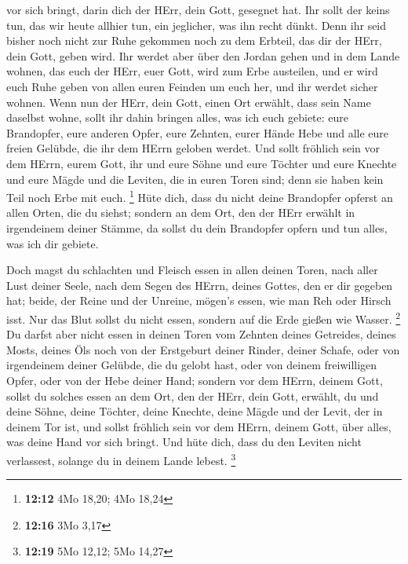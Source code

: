 vor sich bringt, darin dich der HErr, dein Gott, gesegnet hat.
 Ihr sollt der keins tun, das wir heute allhier tun, ein
jeglicher, was ihn recht dünkt.  Denn ihr seid bisher noch
nicht zur Ruhe gekommen noch zu dem Erbteil, das dir der HErr, dein
Gott, geben wird.  Ihr werdet aber über den Jordan gehen
und in dem Lande wohnen, das euch der HErr, euer Gott, wird zum Erbe
austeilen, und er wird euch Ruhe geben von allen euren Feinden um euch
her, und ihr werdet sicher wohnen.  Wenn nun der HErr, dein
Gott, einen Ort erwählt, dass sein Name daselbst wohne, sollt ihr dahin
bringen alles, was ich euch gebiete: eure Brandopfer, eure anderen
Opfer, eure Zehnten, eurer Hände Hebe und alle eure freien Gelübde, die
ihr dem HErrn geloben werdet.  Und sollt fröhlich sein vor
dem HErrn, eurem Gott, ihr und eure Söhne und eure Töchter und eure
Knechte und eure Mägde und die Leviten, die in euren Toren sind; denn
sie haben kein Teil noch Erbe mit euch. \footnote{\textbf{12:12} 4Mo
  18,20; 4Mo 18,24}  Hüte dich, dass du nicht deine
Brandopfer opferst an allen Orten, die du siehst;  sondern
an dem Ort, den der HErr erwählt in irgendeinem deiner Stämme, da sollst
du dein Brandopfer opfern und tun alles, was ich dir gebiete.

 Doch magst du schlachten und Fleisch essen in allen deinen
Toren, nach aller Lust deiner Seele, nach dem Segen des HErrn, deines
Gottes, den er dir gegeben hat; beide, der Reine und der Unreine,
mögen's essen, wie man Reh oder Hirsch isst.  Nur das Blut
sollst du nicht essen, sondern auf die Erde gießen wie Wasser.
\footnote{\textbf{12:16} 3Mo 3,17}  Du darfst aber nicht
essen in deinen Toren vom Zehnten deines Getreides, deines Mosts, deines
Öls noch von der Erstgeburt deiner Rinder, deiner Schafe, oder von
irgendeinem deiner Gelübde, die du gelobt hast, oder von deinem
freiwilligen Opfer, oder von der Hebe deiner Hand;  sondern
vor dem HErrn, deinem Gott, sollst du solches essen an dem Ort, den der
HErr, dein Gott, erwählt, du und deine Söhne, deine Töchter, deine
Knechte, deine Mägde und der Levit, der in deinem Tor ist, und sollst
fröhlich sein vor dem HErrn, deinem Gott, über alles, was deine Hand vor
sich bringt.  Und hüte dich, dass du den Leviten nicht
verlassest, solange du in deinem Lande lebest. \footnote{\textbf{12:19}
  5Mo 12,12; 5Mo 14,27}

